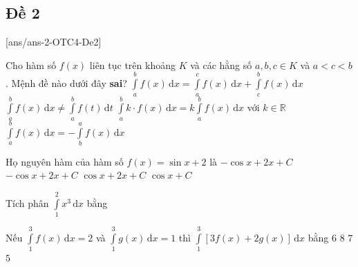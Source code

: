 \subsection{Đề 2}
[ans/ans-2-OTC4-De2]
\caulc
 \begin{ex}%
	Cho hàm số $ f(x) $ liên tục trên khoảng $ K $ và các hằng số $ a, b, c \in K $ và $a<c<b$. Mệnh đề nào dưới đây \textbf{sai}?
	\choice
	{$ \displaystyle \int \limits^b_a f(x)  \mathrm{\,d}x = \displaystyle \int \limits^c_a f(x)   \mathrm{\,d}x + \displaystyle \int \limits^b_c f(x)   \mathrm{\,d}x $}
	{\True $ \displaystyle \int \limits^b_a  f(x) \mathrm{\,d}x \neq \displaystyle \int \limits^b_a f(t)  \mathrm{\,d}t $}
	{$ \displaystyle \int \limits^b_a k \cdot f(x)  \mathrm{\,d}x = \displaystyle k \int \limits^b_a f(x)   \mathrm{\,d}x $ với $ k \in \mathbb{R} $}
	{$ \displaystyle \int \limits^b_a  f(x) \mathrm{\,d}x = \displaystyle - \int \limits^a_b f(x)  \mathrm{\,d}x $}
\end{ex}

\begin{ex}%
	Họ nguyên hàm của hàm số $f(x)=\sin x+2$ là
	\choice
	{\True $-\cos x+2x+C$}
	{$-\cos x+2x+C$}
	{$\cos x+2x+C$}
	{$\cos x+C$}
\end{ex}

\begin{ex}%
	Tích phân $\displaystyle\int\limits_{1}^{2} x^3\mathrm{\,d}x$ bằng
\end{ex}

\begin{ex}%
	Nếu $\displaystyle\int\limits_1^3 f(x)\mathrm{\,d}x=2$ và $\displaystyle\int\limits_1^3 g(x)\mathrm{\,d}x=1$ thì $\displaystyle\int\limits_1^3 [3f(x)+2g(x)]\mathrm{\,d}x$ bằng
	\choice
	{$6$}
	{\True $8$}
	{$7$}
	{$5$}
\end{ex}


